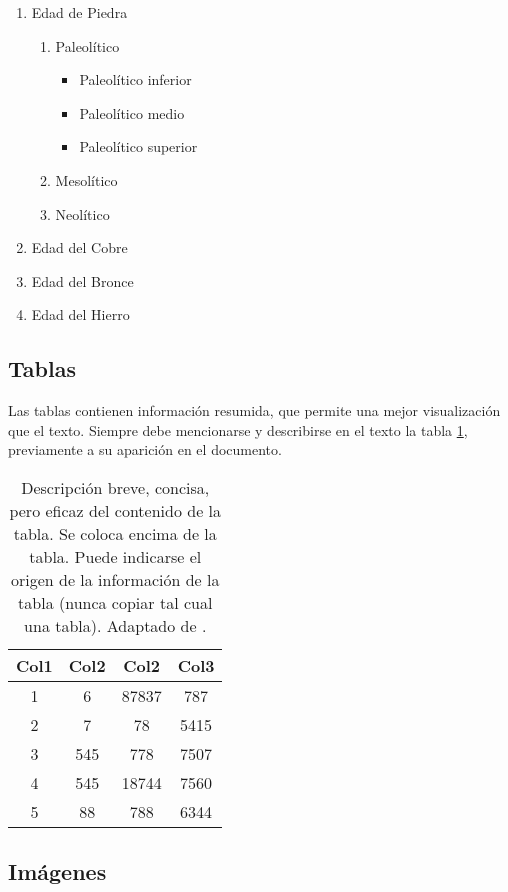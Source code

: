 \begin{enumerate}
\item Edad de Piedra
	\begin{enumerate}
	\item Paleolítico
		\begin{itemize}
		\item Paleolítico inferior
		\item Paleolítico medio
		\item Paleolítico superior
		\end{itemize}
	\item Mesolítico
	\item Neolítico
	\end{enumerate}
\item Edad del Cobre
\item Edad del Bronce
\item Edad del Hierro
\end{enumerate} 

\subsection{Tablas}

Las tablas contienen información resumida, que permite una mejor visualización que el texto. Siempre debe mencionarse y describirse en el texto la tabla \ref{tab:ejemplo}, previamente a su aparición en el documento.

\begin{table}[!ht]
\centering
\caption{Descripción breve, concisa, pero eficaz del contenido de la tabla. Se coloca encima de la tabla. Puede indicarse el origen de la información de la tabla (nunca copiar tal cual una tabla). Adaptado de \citep{bib11}.} 
\label{tab:ejemplo}
\begin{tabular}{c c c c} 
\hline
Col1 & Col2 & Col2 & Col3 \\ [0.5ex] 
\hline\hline
1 & 6 & 87837 & 787 \\ 
2 & 7 & 78 & 5415 \\
3 & 545 & 778 & 7507 \\
4 & 545 & 18744 & 7560 \\
5 & 88 & 788 & 6344 \\ [1ex] 
\hline
\end{tabular}
\end{table}
 
\subsection{Imágenes}

